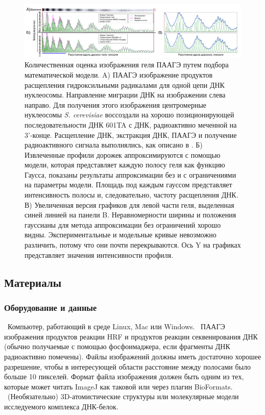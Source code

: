 \begin{figure} [H]
    \centering
    \includegraphics[width=\textwidth]{images/p5/part5_1_np/p5_1_f3.pdf}
    \caption[Количественная оценка изображения геля ПААГЭ путем подбора математической модели.]{Количественная оценка изображения геля ПААГЭ путем подбора математической модели. A) ПААГЭ изображение продуктов расщепления гидроксильными радикалами для одной цепи ДНК нуклеосомы. Направление миграции ДНК на изображении слева направо. Для получения этого изображения центромерные нуклеосомы  \textit{S. cerevisiae} воссоздали на хорошо позиционирующей последовательности ДНК 601TA с ДНК, радиоактивно меченной на 3'-конце. Расщепление ДНК, экстракция ДНК, ПААГЭ и получение радиоактивного сигнала выполнялись, как описано в \cite{shaytan_hydroxyl-radical_2017}. Б) Извлеченные профили дорожек аппроксимируются с помощью модели, которая представляет каждую полосу геля как функцию Гаусса, показаны результаты аппроксимации без и с ограничениями на параметры модели. Площадь под каждым гауссом представляет интенсивность полосы и, следовательно, частоту расщепления ДНК. В) Увеличенная версия графиков для левой части геля, выделенная синей линией на панели B. Неравномерности ширины и положения гауссианы для метода аппроксимации без ограничений хорошо видны. Экспериментальные и модельные кривые невозможно различить, потому что они почти перекрываются. Ось Y на графиках представляет значения интенсивности профиля.}
    \label{fig:p5_1_f3}
\end{figure}
    
    
    \subsection{Материалы}
    \subsubsection{Оборудование и данные}
    
    \textbullet \ Компьютер, работающий в среде Linux, Mac или Windows.
    \textbullet \ ПААГЭ изображения продуктов реакции HRF и продуктов реакции секвенирования ДНК (обычно получаемые с помощью фосфоимаджера, если фрагменты ДНК радиоактивно помечены). Файлы изображений должны иметь достаточно хорошее разрешение, чтобы в интересующей области расстояние между полосами было больше 10 пикселей. Формат файла изображения должен быть одним из тех, которые может читать ImageJ как таковой или через плагин BioFormats.
    \textbullet \ (Необязательно) 3D-атомистические структуры или молекулярные модели исследуемого комплекса ДНК-белок.
    
